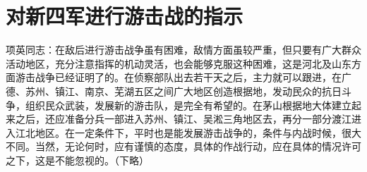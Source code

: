 \section[对新四军进行游击战的指示]{对新四军进行游击战的指示}


项英同志：在敌后进行游击战争虽有困难，敌情方面虽较严重，但只要有广大群众活动地区，充分注意指挥的机动灵活，也会能够克服这种困难，这是河北及山东方面游击战争已经证明了的。在侦察部队出去若干天之后，主力就可以跟进，在广德、苏州、镇江、南京、芜湖五区之间广大地区创造根据地，发动民众的抗日斗争，组织民众武装，发展新的游击队，是完全有希望的。在茅山根据地大体建立起来之后，还应准备分兵一部进入苏州、镇江、吴淞三角地区去，再分一部分渡江进入江北地区。在一定条件下，平时也是能发展游击战争的，条件与内战时候，很大不同。当然，无论何时，应有谨慎的态度，具体的作战行动，应在具体的情况许可之下，这是不能忽视的。（下略）

